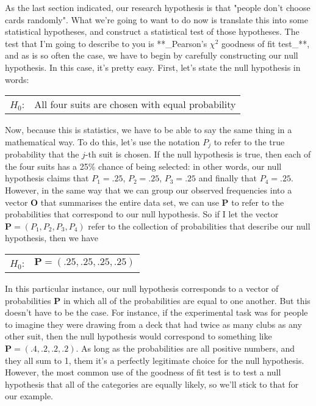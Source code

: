 As the last section indicated, our research hypothesis is that "people don't choose cards randomly". What we're going to want to do now is translate this into some statistical hypotheses, and construct a statistical test of those hypotheses. The test that I'm going to describe to you is **_Pearson's $\chi^2$ goodness of fit test_**, and as is so often the case, we have to begin by carefully constructing our null hypothesis. In this case, it's pretty easy. First, let's state the null hypothesis in words:

\smallskip
\begin{tabular}{ll}
$H_0$: \hspace*{0.5cm} & All four suits are chosen with equal probability
\end{tabular} 
\smallskip


Now, because this is statistics, we have to be able to say the same thing in a mathematical way. To do this, let's use the notation $P_j$ to refer to the true probability that the $j$-th suit is chosen. If the null hypothesis is true, then each of the four suits has a 25\% chance of being selected: in other words, our null hypothesis claims that $P_1 = .25$, $P_2 = .25$, $P_3 = .25$ and finally that $P_4 = .25$. However, in the same way that we can group our observed frequencies into a vector $\bm{O}$ that summarises the entire data set, we can use $\bm{P}$ to refer to the probabilities that correspond to our null hypothesis. So if I let the vector $\bm{P} = (P_1, P_2, P_3, P_4)$ refer to the collection of probabilities that describe our null hypothesis, then we have

\smallskip
\begin{tabular}{ll}
$H_0$:\hspace*{0.5cm}  &  $\bm{P} = (.25, .25, .25, .25) $
\end{tabular} 
\smallskip

In this particular instance, our null hypothesis corresponds to a vector of probabilities $\bm{P}$ in which all of the probabilities are equal to one another. But this doesn't have to be the case. For instance, if the experimental task was for people to imagine they were drawing from a deck that had twice as many clubs as any other suit, then the null hypothesis would correspond to something like $\bm{P} = (.4, .2, .2, .2)$. As long as the probabilities are all positive numbers, and they all sum to 1, them it's a perfectly legitimate choice for the null hypothesis. However, the most common use of the goodness of fit test is to test a null hypothesis that all of the categories are equally likely, so we'll stick to that for our example. 

